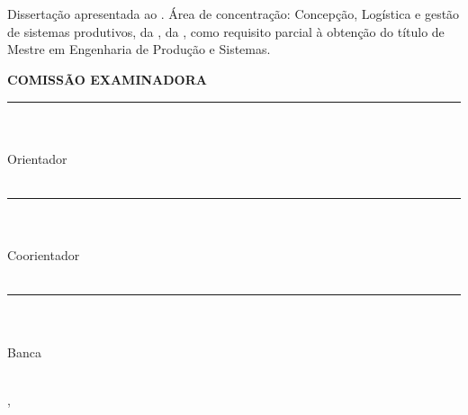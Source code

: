 \begin{center}
    {\singlespacing
    \MakeUppercase{\textbf{\aluno}} \\ [1cm]

    \MakeUppercase{\textbf{\titulo}} \\ [1cm]

    \hspace{.45\textwidth} %
        \begin{minipage}{.5\textwidth}
        \noindent Dissertação apresentada ao \curso. Área de concentração: Concepção, Logística e gestão de sistemas produtivos, da \departamento, da \universidade, como requisito parcial à obtenção do título de Mestre em Engenharia de Produção e Sistemas. \\ [5mm]
        \end{minipage}
    \textbf{COMISSÃO EXAMINADORA} \\ [1cm]
    
    \rule{10cm}{.1mm} \\ \orientador \\ Orientador\\ \universidade \\ [10mm]

    \rule{10cm}{.1mm} \\ \coorientador \\ Coorientador \\ \universidade \\ [10mm]

    \rule{10cm}{.1mm} \\ \convidadoa \\ Banca \\ \univconvidadoa \\ [10mm]
    
    
    \vfill
    
    \cidade, \datadefesa
    }
\end{center}
